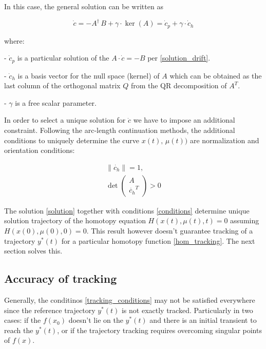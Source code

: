 \documentclass[11pt,american]{article}
\begin{document}
In this case, the general solution can be written as 

\begin{equation}\label{solution}
\dot c = -A^\dagger\,B + \gamma \cdot \ker(A) = \dot c_p + \gamma \cdot \dot c_h
\end{equation}

where:

- $\dot c_p$ is a particular solution of the $A \cdot \dot c = -B$ per \eqref{solution_drift}.

- $\dot c_h$ is a basis vector for the null space (kernel) of $A$ which can be obtained as the last column of the orthogonal matrix $Q$ from the QR decomposition of $A^T$.

- $\gamma$ is a free scalar parameter.

In order to select a unique solution for $\dot c$ we have to impose an additional constraint. Following the arc‐length continuation methods, the additional conditions to uniquely determine the curve $x(t),\,\mu(t))$ are normalization and orientation conditions:

\begin{equation}\label{conditions}
\begin{gathered}
\| \dot{c_h} \| = 1, \\
\det \begin{pmatrix} A \\ \dot{c_h}^T \end{pmatrix} > 0
\end{gathered}
\end{equation}

The solution \eqref{solution} together with conditions \eqref{conditions} determine unique solution trajectory of the homotopy equation $H(x(t),\mu(t),t)=0$ assuming $H(x(0),\mu(0),0)=0$. This result however doesn't guarantee tracking of a trajectory $y^*(t)$ for a particular homotopy function \eqref{hom_tracking}. The next section solves this.

\subsection{Accuracy of tracking}
 
Generally, the conditinos \eqref{tracking_conditions} may not be satisfied everywhere since the reference trajectory $y^*(t)$ is not exactly tracked. Particularly in two cases: if the $f(x_0)$ doesn't lie on the $y^*(t)$ and there is an initial transient to reach the $y^*(t)$, or if the trajectory tracking requires overcoming singular points of $f(x)$.
\end{document}
